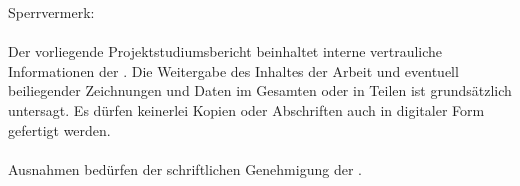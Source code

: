 
\thispagestyle{empty}
\raggedright
\huge{Sperrvermerk:}\\
\ \\
\normalsize
Der vorliegende Projektstudiumsbericht beinhaltet interne vertrauliche Informationen der \unternehmen.
Die Weitergabe des Inhaltes der Arbeit und eventuell beiliegender Zeichnungen und Daten im Gesamten oder in Teilen ist grundsätzlich untersagt.
Es dürfen keinerlei Kopien oder Abschriften auch in digitaler Form gefertigt werden.\\
\ \\
Ausnahmen bedürfen der schriftlichen Genehmigung der \unternehmen.